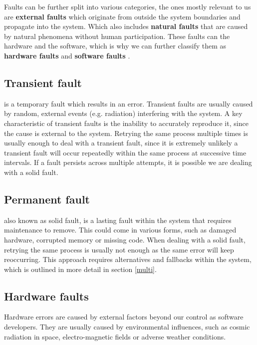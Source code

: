\documentclass[12pt, letterpaper]{article}
\begin{document}
Faults can be further split into various categories, the ones mostly relevant to us are \textbf{external faults} which originate from outside the system boundaries and propagate into the system. Which also includes \textbf{natural faults} that are caused by natural phenomena without human participation. These faults can the hardware and the software, which is why we can further classify them as \textbf{hardware faults} and \textbf{software faults} \cite{1335465}. \\

\subsection{Transient fault} is a temporary fault which results in an error. Transient faults are usually caused by random, external events (e.g. radiation) interfering with the system. A key characteristic of transient faults is the inability to accurately reproduce it, since the cause is external to the system. Retrying the same process multiple times is usually enough to deal with a transient fault, since it is extremely unlikely a transient fault will occur repeatedly within the same process at successive time intervals. If a fault persists across multiple attempts, it is possible we are dealing with a solid fault. \\

\subsection{Permanent fault} also known as solid fault, is a lasting fault within the system that requires maintenance to remove. This could come in various forms, such as damaged hardware, corrupted memory or missing code. When dealing with a solid fault, retrying the same process is usually not enough as the same error will keep reoccurring. This approach requires alternatives and fallbacks within the system, which is outlined in more detail in section \ref{multi}. \\

\subsection{Hardware faults}

Hardware errors are caused by external factors beyond our control as software developers. They are usually caused by environmental influences, such as cosmic radiation in space, electro-magnetic fields or adverse weather conditions.
\end{document}
